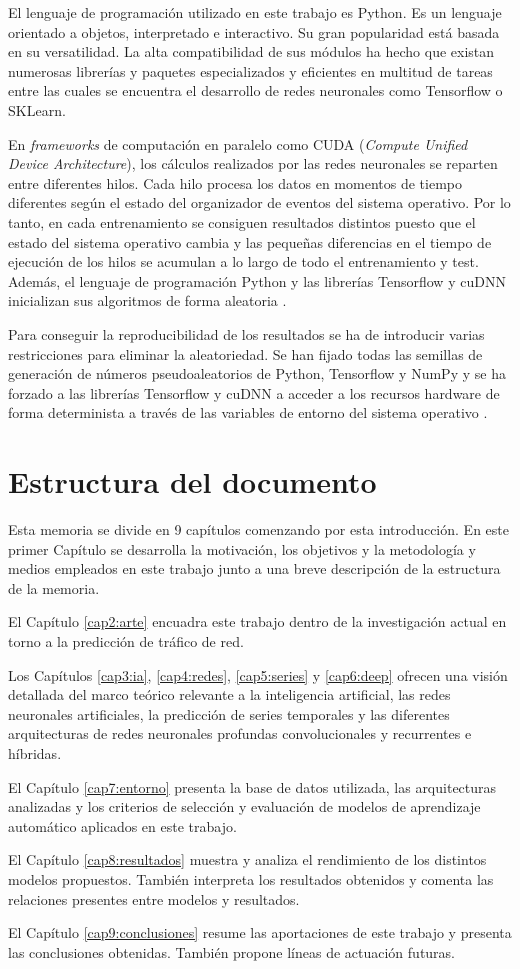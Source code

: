 El lenguaje de programación utilizado en este trabajo es Python. Es un lenguaje orientado a objetos, interpretado e interactivo. Su gran popularidad está basada en su versatilidad. La alta compatibilidad de sus módulos ha hecho que existan numerosas librerías y paquetes especializados y eficientes en multitud de tareas entre las cuales se encuentra el desarrollo de redes neuronales como Tensorflow o SKLearn.

En \textit{frameworks} de computación en paralelo como CUDA (\textit{Compute Unified Device Architecture}), los cálculos realizados por las redes neuronales se reparten entre diferentes hilos. Cada hilo procesa los datos en momentos de tiempo diferentes según el estado del organizador de eventos del sistema operativo. Por lo tanto, en cada entrenamiento se consiguen resultados distintos puesto que el estado del sistema operativo cambia y las pequeñas diferencias en el tiempo de ejecución de los hilos se acumulan a lo largo de todo el entrenamiento y test. Además, el lenguaje de programación Python y las librerías Tensorflow y cuDNN inicializan sus algoritmos de forma aleatoria \cite{tffunction}.

Para conseguir la reproducibilidad de los resultados se ha de introducir varias restricciones para eliminar la aleatoriedad. Se han fijado todas las semillas de generación de números pseudoaleatorios de Python, Tensorflow y NumPy y se ha forzado a las librerías Tensorflow y cuDNN a acceder a los recursos hardware de forma determinista a través de las variables de entorno del sistema operativo \cite{tfdeterministic,nvidiacudnn}.

\section{Estructura del documento}
Esta memoria se divide en 9 capítulos comenzando por esta introducción. En este primer Capítulo se desarrolla la motivación, los objetivos y la metodología y medios empleados en este trabajo junto a una breve descripción de la estructura de la memoria.

El Capítulo \ref{cap2:arte} encuadra este trabajo dentro de la investigación actual en torno a la predicción de tráfico de red.

Los Capítulos \ref{cap3:ia}, \ref{cap4:redes}, \ref{cap5:series} y \ref{cap6:deep} ofrecen una visión detallada del marco teórico relevante a la inteligencia artificial, las redes neuronales artificiales, la predicción de series temporales y las diferentes arquitecturas de redes neuronales profundas convolucionales y recurrentes e híbridas.

El Capítulo \ref{cap7:entorno} presenta la base de datos utilizada, las arquitecturas analizadas y los criterios de selección y evaluación de modelos de aprendizaje automático aplicados en este trabajo.

El Capítulo \ref{cap8:resultados} muestra y analiza el rendimiento de los distintos modelos propuestos. También interpreta los resultados obtenidos y comenta las relaciones presentes entre modelos y resultados.

El Capítulo \ref{cap9:conclusiones} resume las aportaciones de este trabajo y presenta las conclusiones obtenidas. También propone líneas de actuación futuras.
